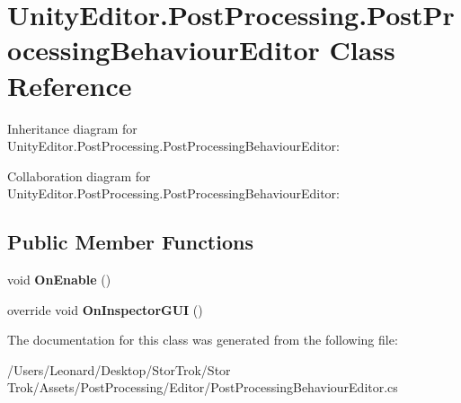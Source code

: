 \hypertarget{class_unity_editor_1_1_post_processing_1_1_post_processing_behaviour_editor}{}\section{Unity\+Editor.\+Post\+Processing.\+Post\+Processing\+Behaviour\+Editor Class Reference}
\label{class_unity_editor_1_1_post_processing_1_1_post_processing_behaviour_editor}


Inheritance diagram for Unity\+Editor.\+Post\+Processing.\+Post\+Processing\+Behaviour\+Editor\+:


Collaboration diagram for Unity\+Editor.\+Post\+Processing.\+Post\+Processing\+Behaviour\+Editor\+:
\subsection*{Public Member Functions}
\begin{DoxyCompactItemize}
\item 
\mbox{\label{class_unity_editor_1_1_post_processing_1_1_post_processing_behaviour_editor_a8934c4d3ca6fe5a4023285ac1a4f3358}} 
void {\bfseries On\+Enable} ()
\item 
\mbox{\label{class_unity_editor_1_1_post_processing_1_1_post_processing_behaviour_editor_a5a78f117e6e64b8abe14976c202ec7f4}} 
override void {\bfseries On\+Inspector\+G\+UI} ()
\end{DoxyCompactItemize}


The documentation for this class was generated from the following file\+:\begin{DoxyCompactItemize}
\item 
/\+Users/\+Leonard/\+Desktop/\+Stor\+Trok/\+Stor Trok/\+Assets/\+Post\+Processing/\+Editor/Post\+Processing\+Behaviour\+Editor.\+cs\end{DoxyCompactItemize}
